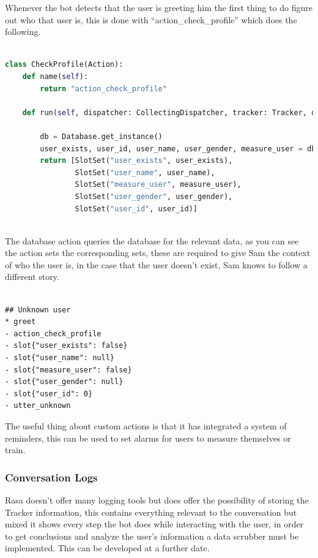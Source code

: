 Whenever the bot detects that the user is greeting him the first thing to do figure out who that user is, this is done with “action\_check\_profile” which does the following.

\begin{lstlisting}[language=Python,caption={Custom Action for Checking Users Profile},captionpos=b]

class CheckProfile(Action):
	def name(self):
		return "action_check_profile"

	def run(self, dispatcher: CollectingDispatcher, tracker: Tracker, domain: Dict[Text, Any]) -> List[Dict[Text, Any]]:

		db = Database.get_instance()
		user_exists, user_id, user_name, user_gender, measure_user = db.check_user_exists(tracker.sender_id)
		return [SlotSet("user_exists", user_exists),
			    SlotSet("user_name", user_name),
				SlotSet("measure_user", measure_user),
				SlotSet("user_gender", user_gender),
				SlotSet("user_id", user_id)]
				
\end{lstlisting}

The database action queries the database for the relevant data, as you can see the action sets the corresponding sets, these are required to give Sam the context of who the user is, in the case that the user doesn’t exist, Sam knows to follow a different story.

\begin{lstlisting}[caption={Unknown User Story},captionpos=b]

## Unknown user
* greet
- action_check_profile
- slot{"user_exists": false}
- slot{"user_name": null}
- slot{"measure_user": false}
- slot{"user_gender": null}
- slot{"user_id": 0}
- utter_unknown

\end{lstlisting}

The useful thing about custom actions is that it has integrated a system of reminders, this can be used to set alarms for users to measure themselves or train.

\subsubsection{Conversation Logs}\label{sec:chap4_conv_logs}

Rasa doesn’t offer many logging tools but does offer the possibility of storing the Tracker information, this contains everything relevant to the conversation but mixed it shows every step the bot does while interacting with the user, in order to get conclusions and analyze the user’s information a data scrubber must be implemented. This can be developed at a further date.

